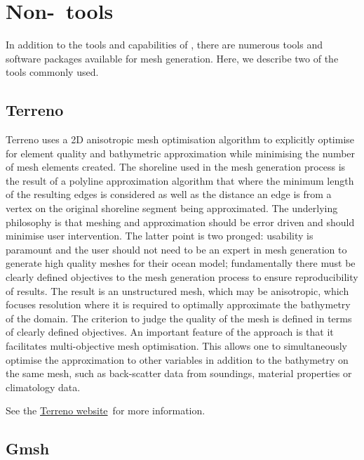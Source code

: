 \section{Non-\fluidity\ tools}

In addition to the tools and capabilities of \fluidity, there are numerous
tools and software packages available for mesh generation. Here, we describe 
two of the tools commonly used.

\subsection{Terreno}
\label{sec:Terreno}

Terreno uses a 2D anisotropic mesh optimisation algorithm to explicitly optimise for 
element quality and bathymetric approximation while minimising the number of mesh
elements created. The shoreline used in the mesh generation process is the result 
of a polyline approximation algorithm that where the minimum length of the resulting 
edges is considered as well as the distance an edge is from a vertex on the original 
shoreline segment being approximated. The underlying philosophy is that meshing and 
approximation should be error driven and should minimise user intervention. The 
latter point is two pronged: usability is paramount and the user should not need 
to be an expert in mesh generation to generate high quality meshes for their ocean 
model; fundamentally there must be clearly defined objectives to the mesh generation 
process to ensure reproducibility of results. The result is an unstructured mesh, 
which may be anisotropic, which focuses resolution where it is required to optimally 
approximate the bathymetry of the domain. The criterion to judge the quality of the 
mesh is defined in terms of clearly defined objectives. An important feature of the 
approach is that it facilitates multi-objective mesh optimisation. This allows one to 
simultaneously optimise the approximation to other variables in addition to the 
bathymetry on the same mesh, such as back-scatter data from soundings, material 
properties or climatology data. 

See the \href{http://amcg.ese.ic.ac.uk/terreno}{Terreno website}\ for more information.

\subsection{Gmsh}
\label{sec:meshing_tools_non_fluidity_gmsh}


